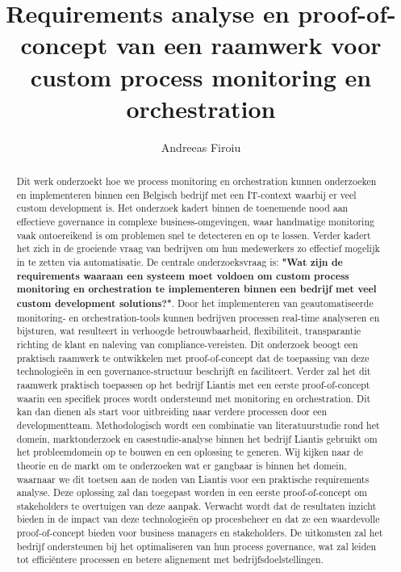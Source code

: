 \documentclass{hogent-article}
\title{Requirements analyse en proof-of-concept van een raamwerk voor custom process
monitoring en orchestration}
\author{Andreeas Firoiu}
\begin{document}
\begin{abstract}
  Dit werk onderzoekt hoe we process monitoring en orchestration kunnen onderzoeken en implementeren binnen een Belgisch bedrijf met een IT-context waarbij er veel custom development is. Het onderzoek kadert binnen de toenemende nood aan effectieve governance in complexe business-omgevingen, waar handmatige monitoring vaak ontoereikend is om problemen snel te detecteren en op te lossen. Verder kadert het zich in de groeiende vraag van bedrijven om hun medewerkers zo effectief mogelijk in te zetten via automatisatie. De centrale onderzoeksvraag is: \textbf{"Wat zijn de requirements waaraan een systeem moet voldoen om custom process monitoring en orchestration te implementeren binnen een bedrijf met veel custom development solutions?"}. Door het implementeren van geautomatiseerde monitoring- en orchestration-tools kunnen bedrijven processen real-time analyseren en bijsturen, wat resulteert in verhoogde betrouwbaarheid, flexibiliteit, transparantie richting de klant en naleving van compliance-vereisten. Dit onderzoek beoogt een praktisch raamwerk te ontwikkelen met proof-of-concept dat de toepassing van deze technologieën in een governance-structuur beschrijft en faciliteert. Verder zal het dit raamwerk praktisch toepassen op het bedrijf Liantis met een eerste proof-of-concept waarin een specifiek proces wordt ondersteund met monitoring en orchestration. Dit kan dan dienen als start voor uitbreiding naar verdere processen door een developmentteam. Methodologisch wordt een combinatie van literatuurstudie rond het domein, marktonderzoek en casestudie-analyse binnen het bedrijf Liantis gebruikt om het probleemdomein op te bouwen en een oplossing te generen. Wij kijken naar de theorie en de markt om te onderzoeken wat er gangbaar is binnen het domein, waarnaar we dit toetsen aan de noden van Liantis voor een praktische requirements analyse. Deze oplossing zal dan toegepast worden in een eerste proof-of-concept om stakeholders te overtuigen van deze aanpak. Verwacht wordt dat de resultaten inzicht bieden in de impact van deze technologieën op procesbeheer en dat ze een waardevolle proof-of-concept bieden voor business managers en stakeholders. De uitkomsten zal het bedrijf ondersteunen bij het optimaliseren van hun process governance, wat zal leiden tot efficiëntere processen en betere alignement met bedrijfsdoelstellingen.
\end{abstract}

\tableofcontents



\printbibliography[heading=bibintoc]
\end{document}
